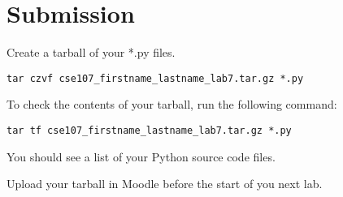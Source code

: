 \documentclass[12pt]{article}
\begin{document}





\section*{Submission}

Create a tarball of your *.py files.

\begin{lstlisting}[style=bash]
tar czvf cse107_firstname_lastname_lab7.tar.gz *.py
\end{lstlisting}


To check the contents of your tarball, run the following command:

\begin{lstlisting}[style=bash]
tar tf cse107_firstname_lastname_lab7.tar.gz *.py
\end{lstlisting}

You should see a list of your Python source code files.

Upload your tarball in Moodle before the start of you next lab.
\end{document}
